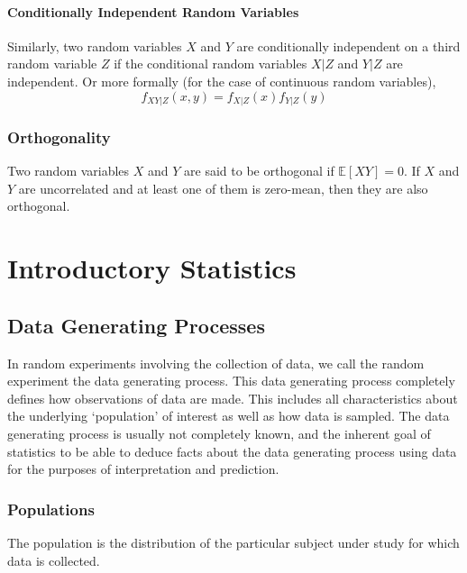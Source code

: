 \documentclass[11pt]{report} %
\begin{document}
\subsubsection{Conditionally Independent Random Variables}

Similarly, two random variables $X$ and $Y$ are conditionally independent on a third random variable $Z$ if the conditional random variables $X|Z$ and $Y|Z$ are independent. Or more formally (for the case of continuous random variables),
\begin{equation}
f_{XY|Z}\left(x, y\right) = f_{X|Z}\left(x\right)f_{Y|Z}\left(y\right)
\end{equation}

\subsection{Orthogonality \cite{Yates2005}}

Two random variables $X$ and $Y$ are said to be orthogonal if $\mathbb{E}\left[XY\right] = 0$. If $X$ and $Y$ are uncorrelated and at least one of them is zero-mean, then they are also orthogonal.

\chapter{Introductory Statistics}

\section{Data Generating Processes}

In random experiments involving the collection of data, we call the random experiment the data generating process. This data generating process completely defines how observations of data are made. This includes all characteristics about the underlying `population' of interest as well as how data is sampled. The data generating process is usually not completely known, and the inherent goal of statistics to be able to deduce facts about the data generating process using data for the purposes of interpretation and prediction.

\subsection{Populations}

The population is the distribution of the particular subject under study for which data is collected.
\end{document}
